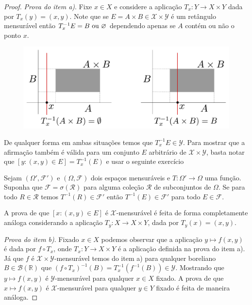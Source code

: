 \begin{proof}
\emph{Prova do item a)}. Fixe $x\in X$ e considere a aplicação  
$T_x:Y\to X\times Y$ dada por $T_x(y)=(x,y)$.
Note que se $E=A\times B\in \mathscr{X}\times \mathscr{Y}$
é um retângulo mensurável então $T_{x}^{-1}E=B~\textnormal{ou}~\varnothing$ 
dependendo apenas se 
$A$ contém ou não o ponto $x$.  
\begin{figure}
\centering
\includegraphics[scale=0.3]{Figuras/fig-medida-produto-aula10}
\caption{}
\label{medida-produto-1}
\end{figure}

\newpage
De qualquer forma 
em ambas situações temos que $T_x^{-1}E\in \mathscr{Y}$.
Para mostrar que a afirmação também é válida para um conjunto 
$E$ arbitrário de $\mathscr{X}\times \mathscr{Y}$, 
basta notar que $[y: (x,y)\in E] = T^{-1}_{x}(E)$ e 
usar o seguinte exercício
\begin{exercicio}
	Sejam $(\Omega',\mathcal{F}')$ e $(\Omega,\mathcal{F})$
	dois espaços mensuráveis e $T:\Omega'\to\Omega$ uma função. 
	Suponha que $\mathcal{F}= \sigma(\mathscr{R})$
	para alguma coleção $\mathscr{R}$ de subconjuntos de $\Omega$.
	Se para todo $R\in \mathscr{R}$ temos $T^{-1}(R)\in \mathcal{F}'$
	então $T^{-1}(E)\in \mathcal{F}'$ para todo $E\in \mathcal{F}$.
\end{exercicio}
%
A prova de que $[x: (x,y)\in E]$ é $\mathscr{X}$-mensurável é feita de 
forma completamente análoga considerando a aplicação 
$T_y:X\to X\times Y$, dada por $T_y(x)=(x,y)$.

\bigskip
\noindent \emph{Prova do item b)}.  
Fixado $x\in X$ podemos observar que a aplicação $y\mapsto f(x,y)$
é dada por $f\circ T_{x}$, onde $T_x:Y\to X\times Y$ é a aplicação 
definida na prova do item a). Já que $f$ é $\mathscr{X}\times\mathscr{Y}$-mensurável
temos do item a) para qualquer boreliano $B\in \mathscr{B}(\mathbb{R})$ que 
$(f\circ T_x)^{-1}(B)= T^{-1}_x(f^{-1}(B)) \in \mathscr{Y}$.
Mostrando que $y\mapsto f(x,y)$ é $\mathscr{Y}$-mensurável para qualquer 
$x\in X$ fixado. A prova de que $x\mapsto f(x,y)$ é $\mathscr{X}$-mensurável 
para qualquer $y\in Y$ fixado é feita de maneira análoga.
\end{proof}


